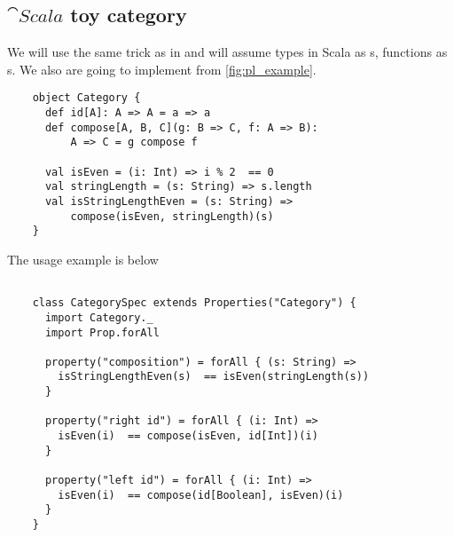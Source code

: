 \subsection{$\cat{Scala}$ toy category}
\begin{example}
  \label{ex:scalacategory}

  We will use the same trick as in  and
  will assume 
  types in Scala as s, 
  functions as s.
  We also are going to implement
   from \cref{fig:pl_example}.

  \begin{verbatim}
    object Category {
      def id[A]: A => A = a => a
      def compose[A, B, C](g: B => C, f: A => B): 
          A => C = g compose f 
      
      val isEven = (i: Int) => i % 2  == 0
      val stringLength = (s: String) => s.length
      val isStringLengthEven = (s: String) => 
          compose(isEven, stringLength)(s)
    }
  \end{verbatim}

  The usage example is below
  \begin{verbatim}
    
    class CategorySpec extends Properties("Category") {
      import Category._
      import Prop.forAll
      
      property("composition") = forAll { (s: String) =>
        isStringLengthEven(s)  == isEven(stringLength(s))
      }
      
      property("right id") = forAll { (i: Int) =>
        isEven(i)  == compose(isEven, id[Int])(i)
      }
      
      property("left id") = forAll { (i: Int) =>
        isEven(i)  == compose(id[Boolean], isEven)(i)
      }
    }
  \end{verbatim}
\end{example}

